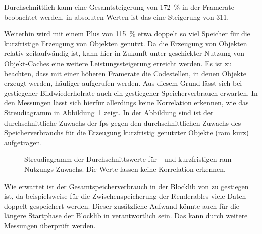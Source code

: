 Durchschnittlich kann eine Gesamtsteigerung von \SI{172}{\percent} in der Framerate beobachtet werden, in absoluten Werten ist das eine Steigerung von \SI{311}{\fps}.

Weiterhin wird mit einem Plus von \SI{115}{\percent} etwa doppelt so viel Speicher für die kurzfristige Erzeugung von Objekten genutzt. Da die Erzeugung von Objekten relativ zeitaufwändig ist, kann hier in Zukunft unter geschickter Nutzung von Objekt-Caches eine weitere Leistungssteigerung erreicht werden. Es ist zu beachten, dass mit einer höheren Framerate die Codestellen, in denen Objekte erzeugt werden, häufiger aufgerufen werden. Aus diesem Grund lässt sich bei gestiegener Bildwiederholrate auch ein gestiegener Speicherverbrauch erwarten. In den Messungen lässt sich hierfür allerdings keine Korrelation erkennen, wie das Streudiagramm in Abbildung~\ref{fig:Streudiagramm} zeigt. In der Abbildung sind ist der durchschnittliche Zuwachs der \ac{fps} gegen den durchschnittlichen Zuwachs des Speicherverbrauchs für die Erzeugung kurzfristig genutzter Objekte (\ac{ram} kurz) aufgetragen. 
\begin{figure}
	\centering
		\caption[Streudiagramm der Durchschnittswerte für - und kurzfristigen -Nutzungs-Zuwachs.]{Streudiagramm der Durchschnittswerte für \si{\fps}- und kurzfristigen \ac{ram}-Nutzungs-Zuwachs. Die Werte lassen keine Korrelation erkennen.}\label{fig:Streudiagramm}
\end{figure}

Wie erwartet ist der Gesamtspeicherverbrauch in der Blocklib von \sysA{} zu \sysB{} gestiegen ist, da beispielsweise für die Zwischenspeicherung der Renderables viele Daten doppelt gespeichert werden. 
Dieser zusätzliche Aufwand könnte auch für die längere Startphase der Blocklib in \sysB{} verantwortlich sein. Das kann durch weitere Messungen überprüft werden.